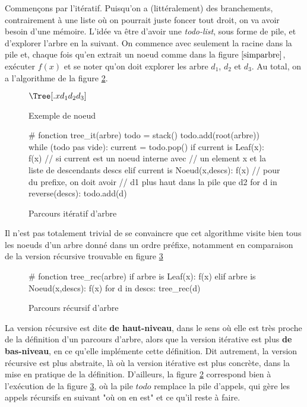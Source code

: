 Commençons par l'itératif. Puisqu'on a (littéralement) des branchements, contrairement à une liste où on pourrait juste foncer tout droit, on va avoir besoin d'une mémoire. L'idée va être d'avoir une \textit{todo-list}, sous forme de pile, et d'explorer l'arbre en la suivant. On commence avec seulement la racine dans la pile et, chaque fois qu'en extrait un noeud comme dans la figure $\ref{simparbre}$, exécuter $f(x)$ et se noter qu'on doit explorer les arbre $d_1$, $d_2$ et $d_3$. Au total, on a l'algorithme de la figure \ref{treeit}.

\begin{figure}[!ht]
\centering
$\Tree[.x d_1 d_2 d_3 ]$
\caption{Exemple de noeud}
\label{simparbre}
\end{figure}

\begin{figure}[!ht]
\begin{python}
# fonction tree_it(arbre)
todo = stack()
todo.add(root(arbre))
while (todo pas vide):
    current = todo.pop()
    if current is Leaf(x):
        f(x)
    // si current est un noeud interne avec 
    // un element x et la liste de descendants descs
    elif current is Noeud(x,descs):
        f(x)
        // pour du prefixe, on doit avoir
        // d1 plus haut dans la pile que d2
        for d in reverse(descs):
             todo.add(d)

\end{python}
\caption{Parcours itératif d'arbre}
\label{treeit}
\end{figure}

Il n'est pas totalement trivial de se convaincre que cet algorithme visite bien tous les noeuds d'un arbre donné dans un ordre préfixe, notamment en comparaison de la version récursive trouvable en figure \ref{treerec}

\begin{figure}[!ht]
\begin{python}
# fonction tree_rec(arbre)
if arbre is Leaf(x):
    f(x)
elif arbre is Noeud(x,descs):
    f(x)
    for d in descs:
        tree_rec(d)
\end{python}
\caption{Parcours récursif d'arbre}
\label{treerec}
\end{figure}

La version récursive est dite \textbf{de haut-niveau}, dans le sens où elle est très proche de la définition d'un parcours d'arbre, alors que la version itérative est plus \textbf{de bas-niveau}, en ce qu'elle implémente cette définition. Dit autrement, la version récursive est plus abstraite, là où la version itérative est plus concrète, dans la mise en pratique de la définition. D'ailleurs, la figure \ref{treeit} correspond bien à l'exécution de la figure \ref{treerec}, où la pile $todo$ remplace la pile d'appels, qui gère les appels récursifs en suivant "où on en est" et ce qu'il reste à faire.

